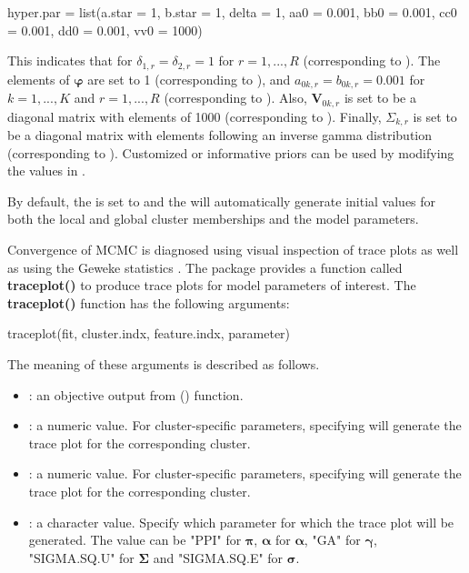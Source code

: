 \begin{example}
hyper.par = list(a.star = 1, b.star = 1, delta = 1, 
		       aa0 = 0.001, bb0 = 0.001, cc0 = 0.001, dd0 = 0.001,  
			  vv0 = 1000)
\end{example}

This indicates that for $\delta_{1,r} = \delta_{2,r} = 1$ for $r = 1,...,R$ (corresponding to ). The elements of $\boldsymbol{\varphi}$ are set to 1 (corresponding to ), and $a_{0k,r} = b_{0k,r} = 0.001 $ for $k = 1,...,K$ and $r = 1,...,R$ (corresponding to ).  Also, $\boldsymbol{V}_{0k,r}$ is set to be a diagonal matrix with elements of 1000 (corresponding to ). Finally, $\Sigma_{k,r}$ is set to be a diagonal matrix with elements following an inverse gamma distribution (corresponding to ). Customized or informative priors can be used by modifying the values in .

By default, the  is set to  and the  will automatically generate initial values for both the local and global cluster memberships and the model parameters. 

Convergence of MCMC is diagnosed using visual inspection of trace plots as well as using the Geweke statistics \citep{Geweke1991}. The  package provides a function called \textbf{traceplot()} to produce trace plots for model parameters of interest. The \textbf{traceplot()} function has the following arguments: 

\begin{example}
traceplot(fit, cluster.indx, feature.indx, parameter)
\end{example}

The meaning of these arguments is described as follows. 

\begin{itemize}

	\item {}: an objective output from () function.  

	\item {}: a numeric value. For cluster-specific parameters, specifying  will generate the trace plot for the corresponding cluster. 

	\item {}: a numeric value. For cluster-specific parameters, specifying  will generate the trace plot for the corresponding cluster. 

	\item {}: a character value. Specify which parameter for which the trace plot will be generated. The value can be "PPI" for $\boldsymbol{\pi}$, $\boldsymbol{\alpha}$ for $\boldsymbol{\alpha}$, "GA" for $\boldsymbol{\gamma}$, "SIGMA.SQ.U" for $\boldsymbol{\Sigma}$ and "SIGMA.SQ.E" for  $\boldsymbol{\sigma}$.

\end{itemize}

